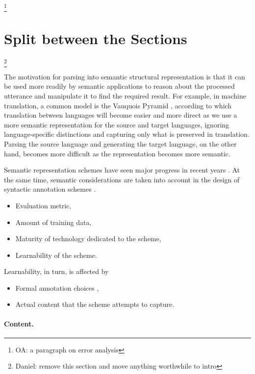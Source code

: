 \documentclass[11pt,a4paper]{article}
\newcommand{\oa}[1]{\footnote{\color{red}OA: #1}}
\newcommand{\daniel}[1]{\footnote{\color{blue}Daniel: #1}}
\begin{document}
  \oa{a paragraph on error analysis}


\section{Split between the Sections}\daniel{remove this section and move anything worthwhile to intro}

  The motivation for parsing into semantic structural representation is that it can be used more readily
  by semantic applications to reason about the processed utterance and manipulate it to find the required
  result.
  For example, in machine translation, a common model is the Vauquois Pyramid 
  \cite{vauquois1968survey},
  according to which translation between languages will become easier and more direct as we use
  a more semantic representation for the source and target languages,
  ignoring language-specific distinctions and capturing only what is preserved in translation.
  Parsing the source language and generating the target language, on the other hand, becomes more
  difficult as the representation becomes more semantic.

  Semantic representation schemes have seen major progress in recent years \cite{abend2017state}.
  At the same time, semantic considerations are taken into account in the design of syntactic annotation schemes
  \cite{przepiorkowski2018arguments}.


  \begin{itemize}
    \item Evaluation metric,
    \item Amount of training data,
    \item Maturity of technology dedicated to the scheme,
    \item Learnability of the scheme.
  \end{itemize}


  Learnability, in turn, is affected by

  \begin{itemize}
    \item Formal annotation choices \cite{Schwartz:12},
    \item Actual content that the scheme attempts to capture.
  \end{itemize}


\paragraph{Content.}
\end{document}
